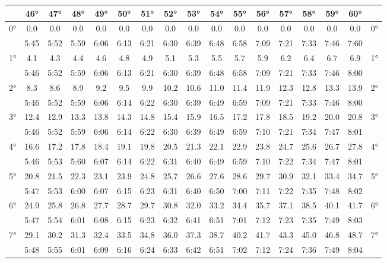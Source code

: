 \begin{footnotesize}\begin{tabular}{c || c | c | c | c | c | c | c | c | c | c | c | c | c | c | c || c}
		\space &46°&47°&48°&49°&50°&51°&52°&53°&54°&55°&56°&57°&58°&59°&60°\\\hline\hline
		\multirow{2}{*}{0°}&0.0&0.0&0.0&0.0&0.0&0.0&0.0&0.0&0.0&0.0&0.0&0.0&0.0&0.0&0.0&\multirow{2}{*}{0°}\\ \space&5:45&5:52&5:59&6:06&6:13&6:21&6:30&6:39&6:48&6:58&7:09&7:21&7:33&7:46&7:60&\space\\\hline
		\multirow{2}{*}{1°}&4.1&4.3&4.4&4.6&4.8&4.9&5.1&5.3&5.5&5.7&5.9&6.2&6.4&6.7&6.9&\multirow{2}{*}{1°}\\ \space&5:46&5:52&5:59&6:06&6:13&6:21&6:30&6:39&6:48&6:58&7:09&7:21&7:33&7:46&8:00&\space\\\hline
		\multirow{2}{*}{2°}&8.3&8.6&8.9&9.2&9.5&9.9&10.2&10.6&11.0&11.4&11.9&12.3&12.8&13.3&13.9&\multirow{2}{*}{2°}\\ \space&5:46&5:52&5:59&6:06&6:14&6:22&6:30&6:39&6:49&6:59&7:09&7:21&7:33&7:46&8:00&\space\\\hline
		\multirow{2}{*}{3°}&12.4&12.9&13.3&13.8&14.3&14.8&15.4&15.9&16.5&17.2&17.8&18.5&19.2&20.0&20.8&\multirow{2}{*}{3°}\\ \space&5:46&5:52&5:59&6:06&6:14&6:22&6:30&6:39&6:49&6:59&7:10&7:21&7:34&7:47&8:01&\space\\\hline
		\multirow{2}{*}{4°}&16.6&17.2&17.8&18.4&19.1&19.8&20.5&21.3&22.1&22.9&23.8&24.7&25.6&26.7&27.8&\multirow{2}{*}{4°}\\ \space&5:46&5:53&5:60&6:07&6:14&6:22&6:31&6:40&6:49&6:59&7:10&7:22&7:34&7:47&8:01&\space\\\hline
		\multirow{2}{*}{5°}&20.8&21.5&22.3&23.1&23.9&24.8&25.7&26.6&27.6&28.6&29.7&30.9&32.1&33.4&34.7&\multirow{2}{*}{5°}\\ \space&5:47&5:53&6:00&6:07&6:15&6:23&6:31&6:40&6:50&7:00&7:11&7:22&7:35&7:48&8:02&\space\\\hline
		\multirow{2}{*}{6°}&24.9&25.8&26.8&27.7&28.7&29.7&30.8&32.0&33.2&34.4&35.7&37.1&38.5&40.1&41.7&\multirow{2}{*}{6°}\\ \space&5:47&5:54&6:01&6:08&6:15&6:23&6:32&6:41&6:51&7:01&7:12&7:23&7:35&7:49&8:03&\space\\\hline
		\multirow{2}{*}{7°}&29.1&30.2&31.3&32.4&33.5&34.8&36.0&37.3&38.7&40.2&41.7&43.3&45.0&46.8&48.7&\multirow{2}{*}{7°}\\ \space&5:48&5:55&6:01&6:09&6:16&6:24&6:33&6:42&6:51&7:02&7:12&7:24&7:36&7:49&8:04&\space\\\hline

\end{tabular}
\end{footnotesize}

